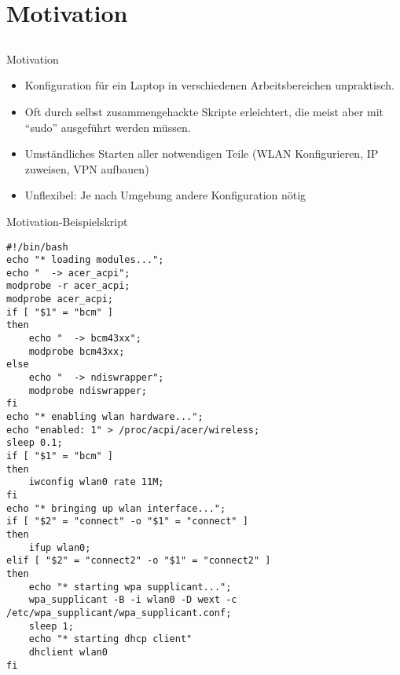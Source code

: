 \section{Motivation}
\subsection{}
\begin{frame}[<+-| alert@+>]{Motivation}
	\begin{itemize}
		\item Konfiguration für ein Laptop in verschiedenen Arbeitsbereichen unpraktisch. \\
		\item Oft durch selbst zusammengehackte Skripte erleichtert, die meist aber mit ``sudo'' ausgeführt werden müssen.
		\item Umständliches Starten aller notwendigen Teile (WLAN Konfigurieren, IP zuweisen, VPN aufbauen)
		\item Unflexibel: Je nach Umgebung andere Konfiguration nötig
	\end{itemize}
\end{frame}

\begin{frame}[fragile]{Motivation-Beispielskript}
\fontsize{4.8}{5.8} \selectfont
\begin{verbatim}
#!/bin/bash
echo "* loading modules...";
echo "  -> acer_acpi";
modprobe -r acer_acpi;
modprobe acer_acpi;
if [ "$1" = "bcm" ]
then
    echo "  -> bcm43xx";
    modprobe bcm43xx;
else
    echo "  -> ndiswrapper";
    modprobe ndiswrapper;
fi
echo "* enabling wlan hardware...";
echo "enabled: 1" > /proc/acpi/acer/wireless;
sleep 0.1;
if [ "$1" = "bcm" ]
then
    iwconfig wlan0 rate 11M;
fi
echo "* bringing up wlan interface...";
if [ "$2" = "connect" -o "$1" = "connect" ]
then
    ifup wlan0;
elif [ "$2" = "connect2" -o "$1" = "connect2" ]
then
    echo "* starting wpa supplicant...";
    wpa_supplicant -B -i wlan0 -D wext -c /etc/wpa_supplicant/wpa_supplicant.conf;
    sleep 1;
    echo "* starting dhcp client"
    dhclient wlan0
fi
\end{verbatim}
\end{frame}

